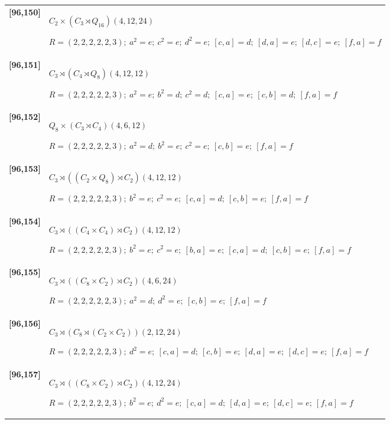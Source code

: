 \documentclass[UTF8,fontset=fandol,11pt,a4paper]{ctexart}
\begin{document}
\begin{longtable}{@{}p{17mm}>{\raggedright\arraybackslash}p{141mm}@{}}
\textbf{[96,150]} & $C_{2}\times (C_{3}\rtimes Q_{16})$\quad $(4,12,24)$\par\(R=(2,2,2,2,2,3);\allowbreak\ a^{2}=e;\allowbreak\ c^{2}=e;\allowbreak\ d^{2}=e;\allowbreak\ [c,a]=d;\allowbreak\ [d,a]=e;\allowbreak\ [d,c]=e;\allowbreak\ [f,a]=f\)\\[3pt]

\textbf{[96,151]} & $C_{3}\rtimes (C_{4}\rtimes Q_{8})$\quad $(4,12,12)$\par\(R=(2,2,2,2,2,3);\allowbreak\ a^{2}=e;\allowbreak\ b^{2}=d;\allowbreak\ c^{2}=d;\allowbreak\ [c,a]=e;\allowbreak\ [c,b]=d;\allowbreak\ [f,a]=f\)\\[3pt]

\textbf{[96,152]} & $Q_{8}\times (C_{3}\rtimes C_{4})$\quad $(4,6,12)$\par\(R=(2,2,2,2,2,3);\allowbreak\ a^{2}=d;\allowbreak\ b^{2}=e;\allowbreak\ c^{2}=e;\allowbreak\ [c,b]=e;\allowbreak\ [f,a]=f\)\\[3pt]

\textbf{[96,153]} & $C_{3}\rtimes ((C_{2}\times Q_{8})\rtimes C_{2})$\quad $(4,12,12)$\par\(R=(2,2,2,2,2,3);\allowbreak\ b^{2}=e;\allowbreak\ c^{2}=e;\allowbreak\ [c,a]=d;\allowbreak\ [c,b]=e;\allowbreak\ [f,a]=f\)\\[3pt]

\textbf{[96,154]} & $C_{3}\rtimes ((C_{4}\times C_{4})\rtimes C_{2})$\quad $(4,12,12)$\par\(R=(2,2,2,2,2,3);\allowbreak\ b^{2}=e;\allowbreak\ c^{2}=e;\allowbreak\ [b,a]=e;\allowbreak\ [c,a]=d;\allowbreak\ [c,b]=e;\allowbreak\ [f,a]=f\)\\[3pt]

\textbf{[96,155]} & $C_{3}\rtimes ((C_{8}\times C_{2})\rtimes C_{2})$\quad $(4,6,24)$\par\(R=(2,2,2,2,2,3);\allowbreak\ a^{2}=d;\allowbreak\ d^{2}=e;\allowbreak\ [c,b]=e;\allowbreak\ [f,a]=f\)\\[3pt]

\textbf{[96,156]} & $C_{3}\rtimes (C_{8}\rtimes (C_{2}\times C_{2}))$\quad $(2,12,24)$\par\(R=(2,2,2,2,2,3);\allowbreak\ d^{2}=e;\allowbreak\ [c,a]=d;\allowbreak\ [c,b]=e;\allowbreak\ [d,a]=e;\allowbreak\ [d,c]=e;\allowbreak\ [f,a]=f\)\\[3pt]

\textbf{[96,157]} & $C_{3}\rtimes ((C_{8}\times C_{2})\rtimes C_{2})$\quad $(4,12,24)$\par\(R=(2,2,2,2,2,3);\allowbreak\ b^{2}=e;\allowbreak\ d^{2}=e;\allowbreak\ [c,a]=d;\allowbreak\ [d,a]=e;\allowbreak\ [d,c]=e;\allowbreak\ [f,a]=f\)\\[3pt]


\end{longtable}
\end{document}
